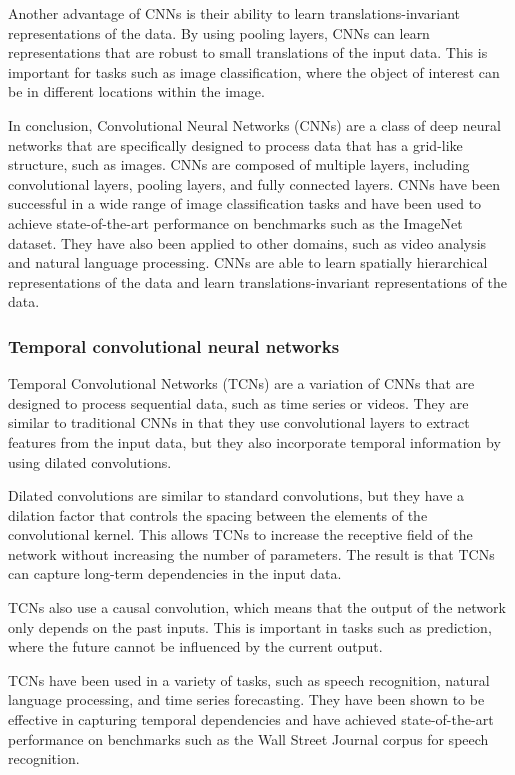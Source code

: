 Another advantage of CNNs is their ability to learn translations-invariant representations of the data.
By using pooling layers, CNNs can learn representations that are robust to small translations of the input data.
This is important for tasks such as image classification, where the object of interest can be in different locations within the image.

In conclusion, Convolutional Neural Networks (CNNs) are a class of deep neural networks that are specifically designed to process data that has a grid-like structure, such as images.
CNNs are composed of multiple layers, including convolutional layers, pooling layers, and fully connected layers.
CNNs have been successful in a wide range of image classification tasks and have been used to achieve state-of-the-art performance on benchmarks such as the ImageNet dataset.
They have also been applied to other domains, such as video analysis and natural language processing.
CNNs are able to learn spatially hierarchical representations of the data and learn translations-invariant representations of the data.

\subsubsection{Temporal convolutional neural networks}

Temporal Convolutional Networks (TCNs) are a variation of CNNs that are designed to process sequential data, such as time series or videos.
They are similar to traditional CNNs in that they use convolutional layers to extract features from the input data, but they also incorporate temporal information by using dilated convolutions.

Dilated convolutions are similar to standard convolutions, but they have a dilation factor that controls the spacing between the elements of the convolutional kernel.
This allows TCNs to increase the receptive field of the network without increasing the number of parameters.
The result is that TCNs can capture long-term dependencies in the input data.

TCNs also use a causal convolution, which means that the output of the network only depends on the past inputs.
This is important in tasks such as prediction, where the future cannot be influenced by the current output.

TCNs have been used in a variety of tasks, such as speech recognition, natural language processing, and time series forecasting.
They have been shown to be effective in capturing temporal dependencies and have achieved state-of-the-art performance on benchmarks such as the Wall Street Journal corpus for speech recognition.

